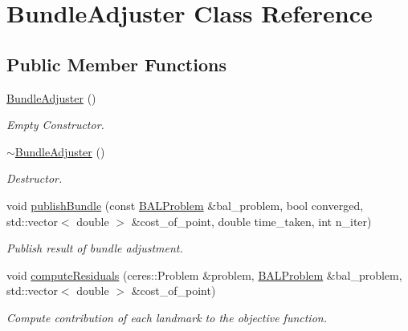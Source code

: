 \hypertarget{classBundleAdjuster}{}\section{Bundle\+Adjuster Class Reference}
\label{classBundleAdjuster}
\subsection*{Public Member Functions}
\begin{DoxyCompactItemize}
\item 
\mbox{\label{classBundleAdjuster_a651f71f75070c7d5cd49efb38c2808bc}} 
\hyperlink{classBundleAdjuster_a651f71f75070c7d5cd49efb38c2808bc}{Bundle\+Adjuster} ()
\begin{DoxyCompactList}\small\item\em Empty Constructor. \end{DoxyCompactList}\item 
\mbox{\label{classBundleAdjuster_a3b3104319a37e77d3d3ed04b8fb8ac69}} 
\hyperlink{classBundleAdjuster_a3b3104319a37e77d3d3ed04b8fb8ac69}{$\sim$\+Bundle\+Adjuster} ()
\begin{DoxyCompactList}\small\item\em Destructor. \end{DoxyCompactList}\item 
void \hyperlink{classBundleAdjuster_a105b7ec8a5ad3518fd1084cec4d86271}{publish\+Bundle} (const \hyperlink{classBALProblem}{B\+A\+L\+Problem} \&bal\+\_\+problem, bool converged, std\+::vector$<$ double $>$ \&cost\+\_\+of\+\_\+point, double time\+\_\+taken, int n\+\_\+iter)
\begin{DoxyCompactList}\small\item\em Publish result of bundle adjustment. \end{DoxyCompactList}\item 
void \hyperlink{classBundleAdjuster_ab02856e3e01f04742f1c74350e5a31da}{compute\+Residuals} (ceres\+::\+Problem \&problem, \hyperlink{classBALProblem}{B\+A\+L\+Problem} \&bal\+\_\+problem, std\+::vector$<$ double $>$ \&cost\+\_\+of\+\_\+point)
\begin{DoxyCompactList}\small\item\em Compute contribution of each landmark to the objective function. \end{DoxyCompactList}\end{DoxyCompactItemize}
